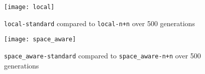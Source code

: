 \begin{figure}[h]
  \centering
  \begin{minipage}{.5\textwidth}
    \centering
    \captionsetup{width=.8\linewidth}
    \texttt{[image: local]}
    \caption{\texttt{local-standard} compared to \texttt{local-n+n} over 500 generations}
    \label{local}
  \end{minipage}%
  \begin{minipage}{.5\textwidth}
    \centering
    \captionsetup{width=.8\linewidth}
    \texttt{[image: space\_aware]}
    \caption{\texttt{space\_aware-standard} compared to \texttt{space\_aware-n+n} over 500 generations}
    \label{space_aware}
  \end{minipage}
\end{figure}

